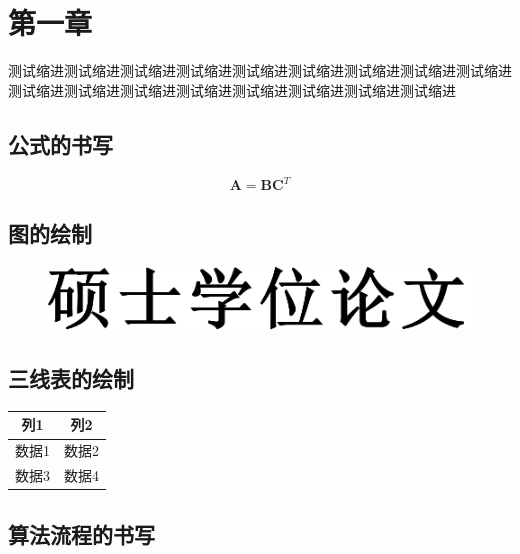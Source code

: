 \chapter{第一章}

测试缩进测试缩进测试缩进测试缩进测试缩进测试缩进测试缩进测试缩进测试缩进测试缩进测试缩进测试缩进测试缩进测试缩进测试缩进测试缩进测试缩进

\section{公式的书写}

\begin{equation}
\label{eq-1}
    \mathbf{A} = \mathbf{B} \mathbf{C}^T
\end{equation}

\section{图的绘制}

\begin{figure}
    \vspace{1em}
    \centering
    \includegraphics[width=0.7\linewidth]{figures/master-hwzs.pdf}
\end{figure}

\section{三线表的绘制}

\begin{table}[h]
    \centering
    \vspace{0.2cm}
    \wuhao
    \begin{tabular}{cc}
        \hline
        列1 & 列2  \\
        \hline
        数据1 & 数据2 \\
        数据3 & 数据4 \\
        \hline
    \end{tabular}
\end{table}

\section{算法流程的书写}

